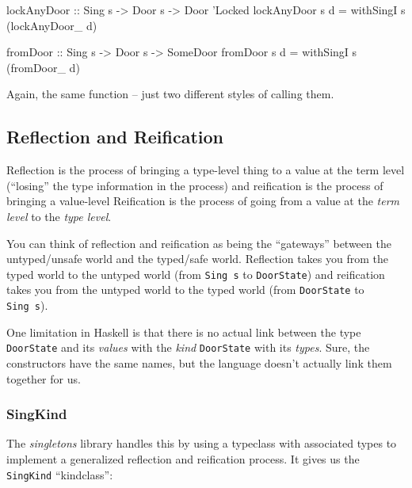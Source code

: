 \documentclass[]{article}
\newenvironment{Shaded}{}{}
\newcommand{\DataTypeTok}[1]{\textcolor[rgb]{0.56,0.13,0.00}{#1}}
\newcommand{\CharTok}[1]{\textcolor[rgb]{0.25,0.44,0.63}{#1}}
\newcommand{\OtherTok}[1]{\textcolor[rgb]{0.00,0.44,0.13}{#1}}
\newcommand{\FunctionTok}[1]{\textcolor[rgb]{0.02,0.16,0.49}{#1}}
\newcommand{\NormalTok}[1]{#1}
\begin{document}
\begin{Shaded}
\begin{Highlighting}[]
\OtherTok{lockAnyDoor ::} \DataTypeTok{Sing}\NormalTok{ s }\OtherTok{->} \DataTypeTok{Door}\NormalTok{ s }\OtherTok{->} \DataTypeTok{Door} \CharTok{'Locked}
\NormalTok{lockAnyDoor s d }\FunctionTok{=}\NormalTok{ withSingI s (lockAnyDoor_ d)}

\OtherTok{fromDoor ::} \DataTypeTok{Sing}\NormalTok{ s }\OtherTok{->} \DataTypeTok{Door}\NormalTok{ s }\OtherTok{->} \DataTypeTok{SomeDoor}
\NormalTok{fromDoor s d }\FunctionTok{=}\NormalTok{ withSingI s (fromDoor_ d)}
\end{Highlighting}
\end{Shaded}

Again, the same function -- just two different styles of calling them.

\subsection{Reflection and Reification}\label{reflection-and-reification}

Reflection is the process of bringing a type-level thing to a value at the term
level (``losing'' the type information in the process) and reification is the
process of bringing a value-level Reification is the process of going from a
value at the \emph{term level} to the \emph{type level}.

You can think of reflection and reification as being the ``gateways'' between
the untyped/unsafe world and the typed/safe world. Reflection takes you from the
typed world to the untyped world (from \texttt{Sing\ s} to \texttt{DoorState})
and reification takes you from the untyped world to the typed world (from
\texttt{DoorState} to \texttt{Sing\ s}).

One limitation in Haskell is that there is no actual link between the type
\texttt{DoorState} and its \emph{values} with the \emph{kind} \texttt{DoorState}
with its \emph{types}. Sure, the constructors have the same names, but the
language doesn't actually link them together for us.

\subsubsection{SingKind}\label{singkind}

The \emph{singletons} library handles this by using a typeclass with associated
types to implement a generalized reflection and reification process. It gives us
the \texttt{SingKind} ``kindclass'':
\end{document}
